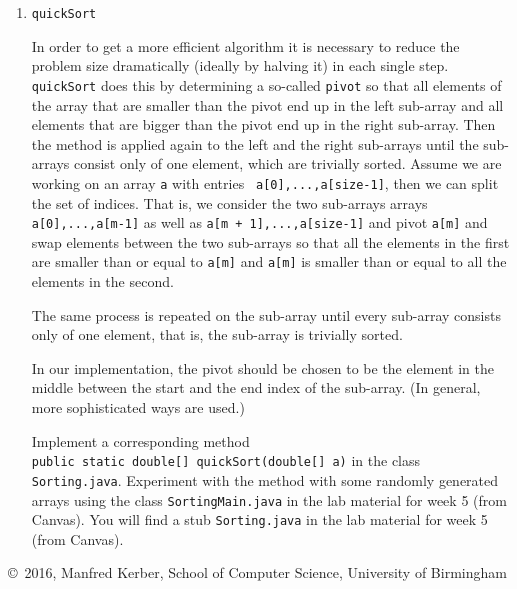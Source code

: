 \documentclass[12pt]{article}
\def\myfooter{\vfill{\footnotesize\noindent\copyright\ 2016, Manfred Kerber, School of Computer Science, University of Birmingham}}
\begin{document}
\begin{enumerate}
\item \texttt{quickSort}

  In order to get a more efficient algorithm it is necessary to reduce
  the problem size dramatically (ideally by halving it) in each single
  step. \texttt{quickSort} does this by determining a so-called
  \texttt{pivot} so that all elements of the array that are smaller
  than the pivot end up in the left sub-array and all elements that
  are bigger than the pivot end up in the right sub-array. Then the
  method is applied again to the left and the right sub-arrays until
  the sub-arrays consist only of one element, which are trivially
  sorted. Assume we are working on an array {\tt a} with entries {\tt
    a[0],...,a[size-1]}, then we can split the set of indices. That
  is, we consider the two sub-arrays arrays {\tt a[0],...,a[m-1]} as
  well as {\tt a[m + 1],...,a[size-1]} and pivot \texttt{a[m]} and
  swap elements between the two sub-arrays so that all the
  elements in the first are smaller than or equal to \texttt{a[m]} and
  \texttt{a[m]} is smaller than or equal to all the elements in the
  second.

  The same process is repeated on the sub-array until every sub-array
  consists only of one element, that is, the sub-array is trivially sorted.

  In our implementation, the pivot should be chosen to be the element
  in the middle between the start and the end index of the
  sub-array. (In general, more sophisticated ways are used.)

  Implement a corresponding method\\ \texttt{public static double[]
    quickSort(double[] a)} in the class \texttt{Sorting.java}.
  Experiment with the method with some randomly generated arrays using
  the class \texttt{SortingMain.java} in the lab material for week 5
  (from Canvas).  You will find a stub \texttt{Sorting.java} in the
  lab material for week 5 (from Canvas).
\end{enumerate}

\myfooter
\end{document}
